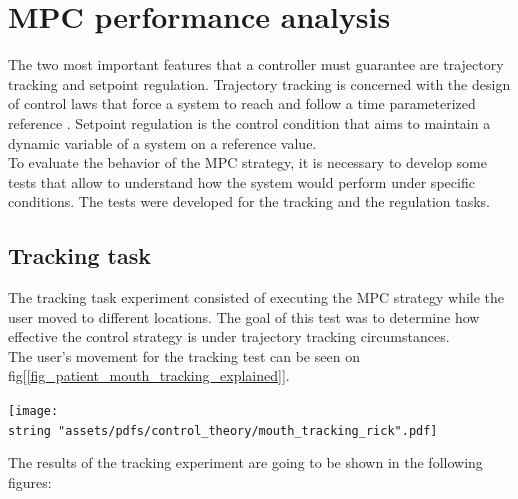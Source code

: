 \documentclass[11pt]{report} %
\begin{document}
\section{MPC performance analysis}
The two most important features that a controller must guarantee are trajectory tracking and setpoint regulation. Trajectory tracking is concerned with the design of control laws that force a system to reach and follow a time
parameterized reference \citep{cite_trajectory_tracking}. Setpoint regulation is the control condition that aims to maintain a dynamic variable of a system on a reference value. \\

To evaluate the behavior of the MPC strategy, it is necessary to develop some tests that allow to understand how the system would perform under specific conditions. The tests were developed for the tracking and the regulation tasks.\\

\subsection{Tracking task}

The tracking task experiment consisted of executing the MPC strategy while the user moved  to different locations. The goal of this test was to determine how effective the control strategy is under trajectory tracking circumstances. \\

The user's movement for the tracking test can be seen on fig[\ref{fig_patient_mouth_tracking_explained}].

\begin{center}
\texttt{[image: \\string "assets/pdfs/control\_theory/mouth\_tracking\_rick".pdf]}
\bigbreak
\begin{minipage}{\linewidth} %
\label{fig_patient_mouth_tracking_explained}
\end{minipage} \end{center}

The results of the tracking experiment are going to be shown in the following figures:
\end{document}
